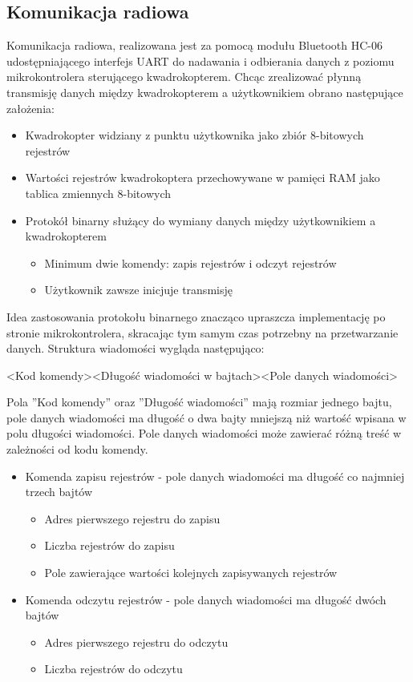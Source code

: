 \subsection{Komunikacja radiowa}

Komunikacja radiowa, realizowana jest za pomocą modułu Bluetooth HC-06 udostępniającego interfejs UART do nadawania i odbierania danych z poziomu mikrokontrolera sterującego kwadrokopterem.
Chcąc zrealizować płynną transmisję danych między kwadrokopterem a użytkownikiem obrano następujące założenia:
\begin{itemize}
	\item Kwadrokopter widziany z punktu użytkownika jako zbiór 8-bitowych rejestrów
	\item Wartości rejestrów kwadrokoptera przechowywane w pamięci RAM jako tablica zmiennych 8-bitowych
	\item Protokół binarny służący do wymiany danych między użytkownikiem a kwadrokopterem
	\begin{itemize}
		\item Minimum dwie komendy: zapis rejestrów i odczyt rejestrów
		\item Użytkownik zawsze inicjuje transmisję
	\end{itemize} 
\end{itemize}

Idea zastosowania protokołu binarnego znacząco upraszcza implementację po stronie mikrokontrolera, skracając tym samym czas potrzebny na przetwarzanie danych. Struktura wiadomości wygląda następująco:

<Kod komendy><Długość wiadomości w bajtach><Pole danych wiadomości>

Pola ''Kod komendy'' oraz ''Długość wiadomości'' mają rozmiar jednego bajtu, pole danych wiadomości ma długość o dwa bajty mniejszą niż wartość wpisana w polu długości wiadomości.
Pole danych wiadomości może zawierać różną treść w zależności od kodu komendy. 
\begin{itemize}
	\item Komenda zapisu rejestrów - pole danych wiadomości ma długość co najmniej trzech bajtów
	\begin{itemize}
		\item Adres pierwszego rejestru do zapisu
		\item Liczba rejestrów do zapisu
		\item Pole zawierające wartości kolejnych zapisywanych rejestrów
	\end{itemize}
	\item Komenda odczytu rejestrów - pole danych wiadomości ma długość dwóch bajtów
	\begin{itemize}
		\item Adres pierwszego rejestru do odczytu
		\item Liczba rejestrów do odczytu
	\end{itemize} 	
\end{itemize} 

